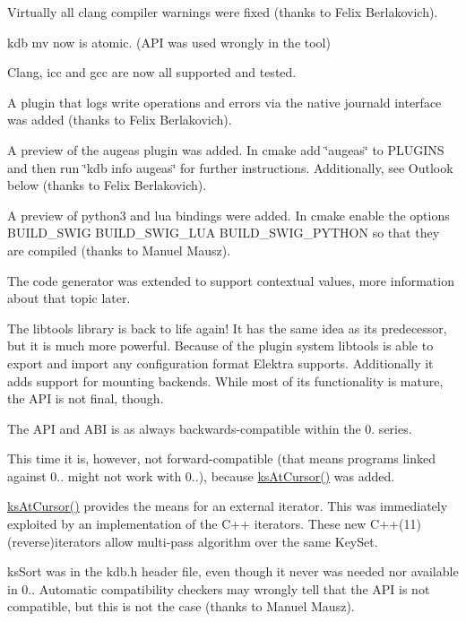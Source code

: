 Virtually all clang compiler warnings were fixed (thanks to Felix Berlakovich).

kdb mv now is atomic. (A\+PI was used wrongly in the tool)

Clang, icc and gcc are now all supported and tested.

A plugin that logs write operations and errors via the native journald interface was added (thanks to Felix Berlakovich).

A preview of the augeas plugin was added. In cmake add \char`\"{}augeas\char`\"{} to P\+L\+U\+G\+I\+NS and then run \char`\"{}kdb info augeas\char`\"{} for further instructions. Additionally, see Outlook below (thanks to Felix Berlakovich).

A preview of python3 and lua bindings were added. In cmake enable the options {\ttfamily B\+U\+I\+L\+D\+\_\+\+S\+W\+IG B\+U\+I\+L\+D\+\_\+\+S\+W\+I\+G\+\_\+\+L\+UA B\+U\+I\+L\+D\+\_\+\+S\+W\+I\+G\+\_\+\+P\+Y\+T\+H\+ON} so that they are compiled (thanks to Manuel Mausz).

The code generator was extended to support contextual values, more information about that topic later.

The libtools library is back to life again! It has the same idea as its predecessor, but it is much more powerful. Because of the plugin system libtools is able to export and import any configuration format Elektra supports. Additionally it adds support for mounting backends. While most of its functionality is mature, the A\+PI is not final, though.

The A\+PI and A\+BI is as always backwards-\/compatible within the 0. series.

This time it is, however, not forward-\/compatible (that means programs linked against 0.. might not work with 0..), because \hyperlink{group__keyset_ga12b8fefaa20546e4790d60338b0db836}{ks\+At\+Cursor()} was added.

\hyperlink{group__keyset_ga12b8fefaa20546e4790d60338b0db836}{ks\+At\+Cursor()} provides the means for an external iterator. This was immediately exploited by an implementation of the C++ iterators. These new C++(11) (reverse)iterators allow multi-\/pass algorithm over the same Key\+Set.

ks\+Sort was in the kdb.\+h header file, even though it never was needed nor available in 0.. Automatic compatibility checkers may wrongly tell that the A\+PI is not compatible, but this is not the case (thanks to Manuel Mausz).

